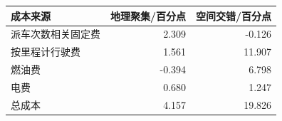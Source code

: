 \begin{tabular*}{0.84\linewidth}{@{\extracolsep{\fill}}lrr@{}}
\toprule
成本来源 & 地理聚集/百分点 & 空间交错/百分点 \\
\midrule
派车次数相关固定费 & 2.309 & -0.126 \\
按里程计行驶费 & 1.561 & 11.907 \\
燃油费 & -0.394 & 6.798 \\
电费 & 0.680 & 1.247 \\
总成本 & 4.157 & 19.826 \\
\bottomrule
\end{tabular*}
